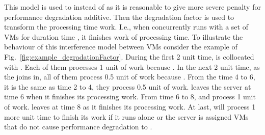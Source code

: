 \documentclass[10pt,journal]{IEEEtran}
\begin{document}
This model is used to instead of  as it is reasonable to give more severe penalty for performance degradation additive. Then the degradation factor is used to transform the processing time work. I.e., when  concurrently runs with a set  of VMs for duration time , it finishes  work of processing time. To illustrate the behaviour of this interference model between VMs consider the example of Fig.~\ref{fig:example_degradationFactor}. During the first 2 unit time,  is collocated with . Each of them processes 1 unit of work because . In the next 2 unit time, as the  joins in, all of them process 0.5 unit of work because . From the time 4 to 6, it is the same as time 2 to 4, they process 0.5 unit of work.  leaves the server at time 6 when it finishes its processing work. From time 6 to 8,  and  process 1 unit of work.  leaves at time 8 as it finishes its processing work. At last,  will process 1 more unit time to finish its work if it runs alone or the server is assigned VMs that do not cause performance degradation to .
\end{document}
